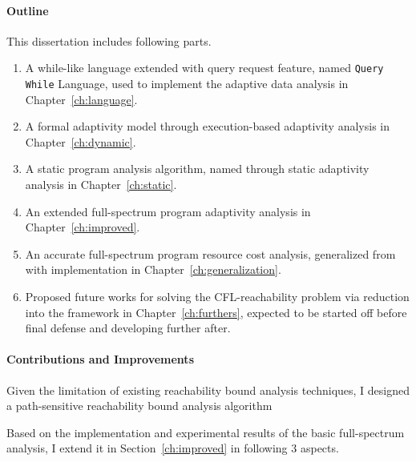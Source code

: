 \paragraph*{Outline}
This dissertation includes following parts. 
\begin{enumerate}
\item A while-like language extended with query request feature, named {\tt Query While} Language, 
used to implement 
the adaptive data analysis in Chapter~\ref{ch:language}.
\item A formal adaptivity model through execution-based adaptivity analysis in Chapter~\ref{ch:dynamic}.
\item A static program analysis algorithm, named {\THESYSTEM} through static adaptivity analysis in Chapter~\ref{ch:static}.
\item An extended full-spectrum program adaptivity analysis in Chapter~\ref{ch:improved}.
\item An accurate full-spectrum program resource cost analysis, 
generalized from {\THESYSTEM} with implementation in Chapter~\ref{ch:generalization}.
\item Proposed future works for solving the CFL-reachability problem via reduction into the {\THESYSTEM} framework in
Chapter~\ref{ch:furthers},
expected to be started off before final defense and developing further after.
\end{enumerate}



\paragraph*{Contributions and Improvements}
Given the limitation of existing reachability bound analysis techniques, I designed a path-sensitive reachability bound 
analysis algorithm

Based on the implementation and experimental results of the basic full-spectrum analysis,
I 
extend it in Section~\ref{ch:improved} in following 3 aspects.


